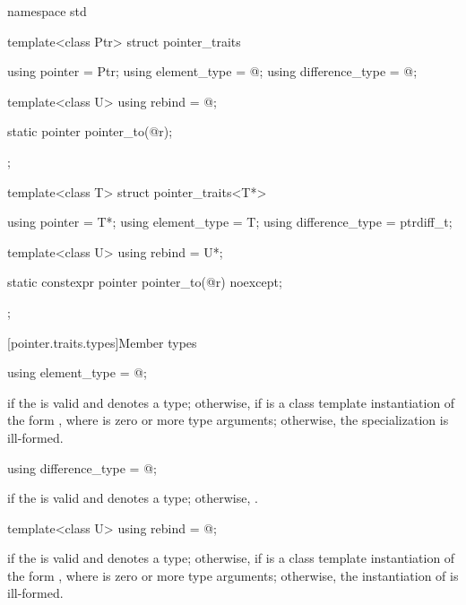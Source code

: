 %
\begin{codeblock}
namespace std {
  template<class Ptr> struct pointer_traits {
    using pointer         = Ptr;
    using element_type    = @\seebelow@;
    using difference_type = @\seebelow@;

    template<class U> using rebind = @\seebelow@;

    static pointer pointer_to(@\seebelow@ r);
  };

  template<class T> struct pointer_traits<T*> {
    using pointer         = T*;
    using element_type    = T;
    using difference_type = ptrdiff_t;

    template<class U> using rebind = U*;

    static constexpr pointer pointer_to(@\seebelow@ r) noexcept;
  };
}
\end{codeblock}

[pointer.traits.types]{Member types}

%
\begin{itemdecl}
using element_type = @\seebelow@;
\end{itemdecl}

\begin{itemdescr}
\pnum
\ctype {} if
the   is valid and denotes a
type; otherwise,  if
 is a class template instantiation of the form ,
where  is zero or more type arguments; otherwise, the specialization is
ill-formed.
\end{itemdescr}

%
\begin{itemdecl}
using difference_type = @\seebelow@;
\end{itemdecl}

\begin{itemdescr}
\pnum
\ctype {} if
the   is valid and denotes a
type; otherwise,
.
\end{itemdescr}

%
\begin{itemdecl}
template<class U> using rebind = @\seebelow@;
\end{itemdecl}

\begin{itemdescr}
\pnum
\templalias {} if
the   is valid and denotes a
type; otherwise,
 if
 is a class template instantiation of the form ,
where  is zero or more type arguments; otherwise, the instantiation of
 is ill-formed.
\end{itemdescr}

